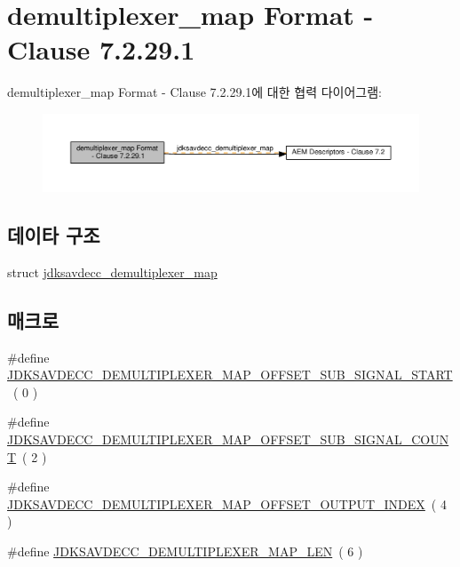 \hypertarget{group__demultiplexer__map}{}\section{demultiplexer\+\_\+map Format -\/ Clause 7.2.29.1}
\label{group__demultiplexer__map}
demultiplexer\+\_\+map Format -\/ Clause 7.2.29.1에 대한 협력 다이어그램\+:
\nopagebreak
\begin{figure}[H]
\begin{center}
\leavevmode
\includegraphics[width=350pt]{group__demultiplexer__map}
\end{center}
\end{figure}
\subsection*{데이타 구조}
\begin{DoxyCompactItemize}
\item 
struct \hyperlink{structjdksavdecc__demultiplexer__map}{jdksavdecc\+\_\+demultiplexer\+\_\+map}
\end{DoxyCompactItemize}
\subsection*{매크로}
\begin{DoxyCompactItemize}
\item 
\#define \hyperlink{group__demultiplexer__map_gafa458221cc97b8f53204b6311537ca2e}{J\+D\+K\+S\+A\+V\+D\+E\+C\+C\+\_\+\+D\+E\+M\+U\+L\+T\+I\+P\+L\+E\+X\+E\+R\+\_\+\+M\+A\+P\+\_\+\+O\+F\+F\+S\+E\+T\+\_\+\+S\+U\+B\+\_\+\+S\+I\+G\+N\+A\+L\+\_\+\+S\+T\+A\+RT}~( 0 )
\item 
\#define \hyperlink{group__demultiplexer__map_gac0a7c761d3bd8bae0c6316b65a57e5df}{J\+D\+K\+S\+A\+V\+D\+E\+C\+C\+\_\+\+D\+E\+M\+U\+L\+T\+I\+P\+L\+E\+X\+E\+R\+\_\+\+M\+A\+P\+\_\+\+O\+F\+F\+S\+E\+T\+\_\+\+S\+U\+B\+\_\+\+S\+I\+G\+N\+A\+L\+\_\+\+C\+O\+U\+NT}~( 2 )
\item 
\#define \hyperlink{group__demultiplexer__map_ga388555454acbb7bf8e04c86ed4c2b99f}{J\+D\+K\+S\+A\+V\+D\+E\+C\+C\+\_\+\+D\+E\+M\+U\+L\+T\+I\+P\+L\+E\+X\+E\+R\+\_\+\+M\+A\+P\+\_\+\+O\+F\+F\+S\+E\+T\+\_\+\+O\+U\+T\+P\+U\+T\+\_\+\+I\+N\+D\+EX}~( 4 )
\item 
\#define \hyperlink{group__demultiplexer__map_ga8b3c020525226264283bd200ab36296e}{J\+D\+K\+S\+A\+V\+D\+E\+C\+C\+\_\+\+D\+E\+M\+U\+L\+T\+I\+P\+L\+E\+X\+E\+R\+\_\+\+M\+A\+P\+\_\+\+L\+EN}~( 6 )
\end{DoxyCompactItemize}
